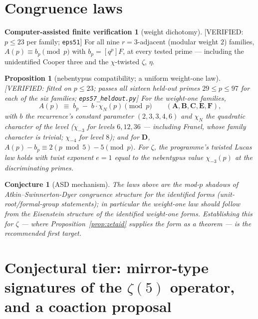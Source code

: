 \documentclass[11pt,reqno]{amsart}
\theoremstyle{plain}
\newtheorem{proposition}[theorem]{Proposition}
\newtheorem{conjecture}[theorem]{Conjecture}
\theoremstyle{definition}
\newtheorem{verification}[theorem]{Computer-assisted finite verification}
\theoremstyle{remark}
\newcommand{\VerifiedR}[1]{\textup{\textsf{[VERIFIED: #1]}}}
\begin{document}
\section{Congruence laws}\label{sec:cong}

\begin{verification}[weight dichotomy]\label{ver:asd}
\VerifiedR{$p\le23$ per family; \texttt{eps51}}\quad
For all nine $r=3$-adjacent (modular weight $2$) families,
$A(p)\equiv b_p\pmod p$ with $b_p=[q^p]F$, at every tested prime ---
including the unidentified Cooper three and the $\chi$-twisted $\zeta$,
$\eta$.
\end{verification}

\begin{proposition}[nebentypus compatibility; a uniform weight-one law]
\label{prop:wt1}
\VerifiedR{fitted on $p\le23$; \emph{passes all sixteen held-out primes}
$29\le p\le97$ for each of the six families; \texttt{eps57\_heldout.py}}\quad
For the weight-one families,
\[
A(p)\;\equiv\;b_p\;-\;b\cdot\chi_N(p)\pmod p
\qquad(\mathbf A,\mathbf B,\mathbf C,\mathbf E,\mathbf F),
\]
with $b$ the recurrence's constant parameter $(2,3,3,4,6)$ and $\chi_N$
the quadratic character of the \emph{level} ($\chi_{-3}$ for levels
$6,12,36$ --- including Franel, whose family character is trivial;
$\chi_{-4}$ for level $8$); and for $\mathbf D$,
$A(p)-b_p\equiv2(p\bmod5)-5\pmod p$. For $\zeta$, the programme's twisted
Lucas law holds with twist exponent $e=1$ equal to the nebentypus value
$\chi_{-3}(p)$ at the discriminating primes.
\end{proposition}

\begin{conjecture}[ASD mechanism]\label{conj:asd}
The laws above are the mod-$p$ shadows of Atkin--Swinnerton-Dyer
congruence structure for the identified forms (unit-root/formal-group
statements); in particular the weight-one law should follow from the
Eisenstein structure of the identified weight-one forms. Establishing
this for $\zeta$ --- where Proposition~\ref{prop:zetaid} supplies the
form as a theorem --- is the recommended first target.
\end{conjecture}

\section{Conjectural tier: mirror-type signatures of the $\zeta(5)$
operator, and a coaction proposal}\label{sec:mirror}
\end{document}
